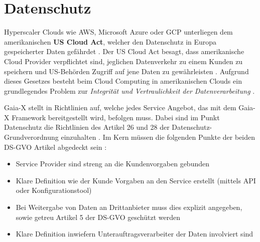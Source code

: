 \chapter{Datenschutz}
\label{chapter:datenschutz}
Hyperscaler Clouds wie \ac{AWS}, Microsoft Azure oder \ac{GCP} unterliegen dem amerikanischen \textbf{US Cloud Act}, welcher
den Datenschutz in Europa gespeicherter Daten gefährdet \cite{Kagermann2021}. Der US Cloud Act besagt,
dass amerikanische Cloud Provider verpflichtet sind, jeglichen Datenverkehr zu einem Kunden zu speichern und 
US-Behörden Zugriff auf jene Daten zu gewährleisten \cite{CloudAct2018}.
Aufgrund dieses Gesetzes besteht beim Cloud Computing in amerikanischen Clouds ein grundlegendes Problem 
zur \emph{Integrität und Vertraulichkeit der Datenverarbeitung} \cite{Weichert2010}.


Gaia-X stellt in \cite{Gaia-XPolicy} Richtlinien auf, welche jedes Service Angebot, das mit dem Gaia-X Framework bereitgestellt wird,
befolgen muss. 
Dabei sind im Punkt Datenschutz die Richtlinien des Artikel 26 und 28 der Datenschutz-Grundverordnung einzuhalten \cite{Gaia-XPolicy}.
Im Kern müssen die folgenden Punkte der beiden DS-GVO Artikel abgedeckt sein \cite{Gaia-XPolicy}:
\begin{itemize}
  \item Service Provider sind streng an die Kundenvorgaben gebunden
  \item Klare Definition wie der Kunde Vorgaben an den Service erstellt (mittels API oder Konfigurationstool)
  \item Bei Weitergabe von Daten an Drittanbieter muss dies explizit angegeben, sowie getreu Artikel 5 der DS-GVO geschützt werden
  \item Klare Definition inwiefern Unterauftragsverarbeiter der Daten involviert sind
\end{itemize}



